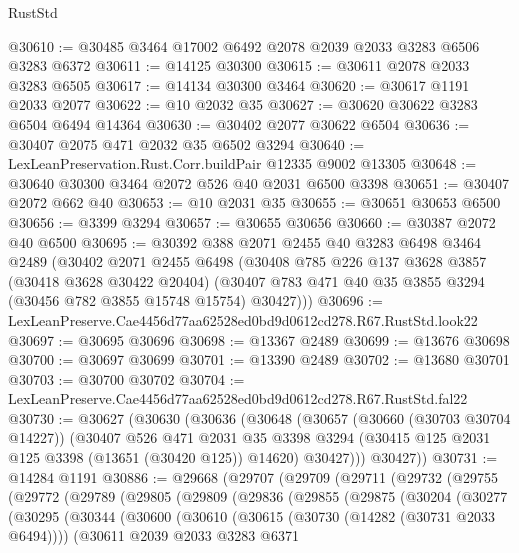\begin{lexlean}{RustStd}
\begin{coremodule}
@30610 := @30485 @3464 @17002 @6492 @2078 @2039 @2033 @3283 @6506 @3283 @6372
@30611 := @14125 @30300
@30615 := @30611 @2078 @2033 @3283 @6505
@30617 := @14134 @30300 @3464
@30620 := @30617 @1191 @2033 @2077
@30622 := @10 @2032 @35
@30627 := @30620 @30622 @3283 @6504 @6494 @14364
@30630 := @30402 @2077 @30622 @6504
@30636 := @30407 @2075 @471 @2032 @35 @6502 @3294
@30640 := LexLeanPreservation.Rust.Corr.buildPair @12335 @9002 @13305
@30648 := @30640 @30300 @3464 @2072 @526 @40 @2031 @6500 @3398
@30651 := @30407 @2072 @662 @40
@30653 := @10 @2031 @35
@30655 := @30651 @30653 @6500
@30656 := @3399 @3294
@30657 := @30655 @30656
@30660 := @30387 @2072 @40 @6500
@30695 := @30392
    @388
    @2071
    @2455
    @40
    @3283
    @6498
    @3464
    @2489
    (@30402
      @2071
      @2455
      @6498
      (@30408
        @785
        @226
        @137
        @3628
        @3857
        (@30418 @3628 @30422 @20404)
        (@30407 @783 @471 @40 @35 @3855 @3294 (@30456 @782 @3855 @15748 @15754) @30427)))
@30696 := LexLeanPreserve.Cae4456d77aa62528ed0bd9d0612cd278.R67.RustStd.look22
@30697 := @30695 @30696
@30698 := @13367 @2489
@30699 := @13676 @30698
@30700 := @30697 @30699
@30701 := @13390 @2489
@30702 := @13680 @30701
@30703 := @30700 @30702
@30704 := LexLeanPreserve.Cae4456d77aa62528ed0bd9d0612cd278.R67.RustStd.fal22
@30730 := @30627
    (@30630
      (@30636
        (@30648
          (@30657
            (@30660 (@30703 @30704 @14227))
            (@30407
              @526
              @471
              @2031
              @35
              @3398
              @3294
              (@30415 @125 @2031 @125 @3398 (@13651 (@30420 @125)) @14620)
              @30427)))
        @30427))
@30731 := @14284 @1191
@30886 := @29668
    (@29707
      (@29709
        (@29711
          (@29732
            (@29755
              (@29772
                (@29789
                  (@29805
                    (@29809
                      (@29836
                        (@29855
                          (@29875
                            (@30204
                              (@30277
                                (@30295
                                  (@30344
                                    (@30600
                                      (@30610
                                        (@30615 (@30730 (@14282 (@30731 @2033 @6494))))
                                        (@30611
                                          @2039
                                          @2033
                                          @3283
                                          @6371

\end{coremodule}
\end{lexlean}
